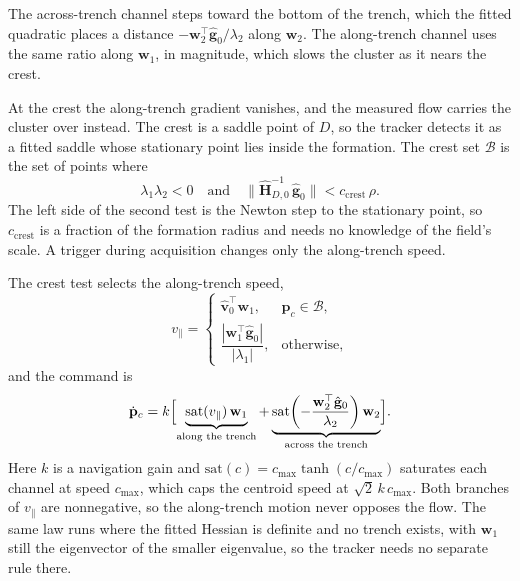 \documentclass[lettersize,journal]{IEEEtran}
\begin{document}
The across-trench channel steps toward the bottom of the trench, which
the fitted quadratic places a distance
$-\mathbf{w}_2^\top\hat{\mathbf{g}}_0/\lambda_2$ along $\mathbf{w}_2$. The
along-trench channel uses the same ratio along $\mathbf{w}_1$, in
magnitude, which slows the cluster as it nears the crest.

At the crest the along-trench gradient vanishes, and the measured flow
carries the cluster over instead. The crest is a saddle point of $D$, so
the tracker detects it as a fitted saddle whose stationary point lies
inside the formation. The crest set $\mathcal{B}$ is the set of points
where
\begin{equation}
    \lambda_1\lambda_2 < 0
    \quad\text{and}\quad
    \bigl\|\hat{\mathbf{H}}_{D,0}^{-1}\,\hat{\mathbf{g}}_0\bigr\|
        < c_{\mathrm{crest}}\,\rho.
    \label{eq:band}
\end{equation}
The left side of the second test is the Newton step to the stationary
point, so $c_{\mathrm{crest}}$ is a fraction of the formation radius and
needs no knowledge of the field's scale. A trigger during acquisition
changes only the along-trench speed.

The crest test selects the along-trench speed,
\begin{equation}
    v_\parallel =
    \begin{cases}
        \hat{\mathbf{v}}_0^\top \mathbf{w}_1,
            & \mathbf{p}_c \in \mathcal{B}, \\[6pt]
        \dfrac{|\mathbf{w}_1^\top \hat{\mathbf{g}}_0|}{|\lambda_1|},
            & \text{otherwise},
    \end{cases}
    \label{eq:vpar}
\end{equation}
and the command is
\begin{equation}
    \dot{\mathbf{p}}_c = k\Bigl[
    \underbrace{\mathrm{sat}(v_\parallel)\,\mathbf{w}_1}_{\text{along the trench}}
    + \underbrace{\mathrm{sat}\!\left(-\frac{\mathbf{w}_2^\top
      \hat{\mathbf{g}}_0}{\lambda_2}\right)\mathbf{w}_2}_{\text{across the trench}}\Bigr].
    \label{eq:d_law}
\end{equation}
Here $k$ is a navigation gain and
$\mathrm{sat}(c) = c_{\max}\tanh(c/c_{\max})$ saturates each channel at
speed $c_{\max}$, which caps the centroid speed at $\sqrt{2}\,k\,c_{\max}$.
Both branches of $v_\parallel$ are nonnegative, so the along-trench
motion never opposes the flow. The same law runs where the fitted Hessian
is definite and no trench exists, with $\mathbf{w}_1$ still the
eigenvector of the smaller eigenvalue, so the tracker needs no separate
rule there.
\end{document}
